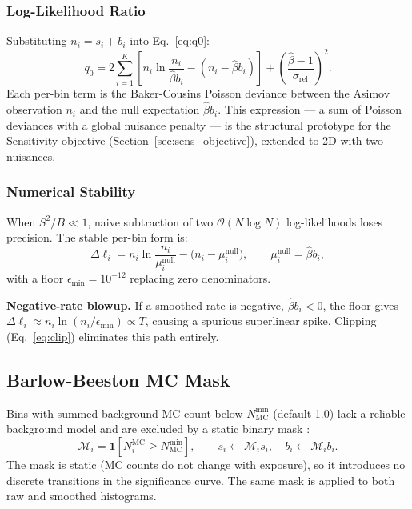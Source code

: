 \documentclass[12pt,a4paper]{article}
\newcommand{\si}{s_{i}}                  %
\newcommand{\bi}{b_{i}}                  %
\newcommand{\nni}{n_{i}}                 %
\newcommand{\bhat}{\hat{\beta}}
\newcommand{\srel}{\sigma_{\mathrm{rel}}}
\newcommand{\minexp}{\epsilon_{\min}}
\begin{document}
\subsubsection{Log-Likelihood Ratio}
\label{sec:llr}

Substituting $\nni = \si+\bi$ into Eq.~\eqref{eq:q0}:
\begin{equation}
  q_0 = 2\sum_{i=1}^{K}
    \left[\nni\ln\!\frac{\nni}{\bhat \bi} - (\nni-\bhat \bi)\right]
    + \left(\frac{\bhat-1}{\srel}\right)^{\!2}.
  \label{eq:q0_expanded}
\end{equation}
Each per-bin term is the Baker-Cousins Poisson deviance \cite{BakerCousins1984}
between the Asimov observation $\nni$ and the null expectation $\bhat\bi$.
This expression — a sum of Poisson deviances with a global nuisance penalty
— is the structural prototype for the Sensitivity objective
(Section~\ref{sec:sens_objective}), extended to 2D with two nuisances.

\subsubsection{Numerical Stability}
\label{sec:pl_numerical}

When $S^2/B \ll 1$, naive subtraction of two $\mathcal{O}(N\log N)$
log-likelihoods loses precision.  The stable per-bin form is:
\begin{equation}
  \Delta\ell_i = \nni\ln\!\frac{\nni}{\mu_i^{\mathrm{null}}}
    - \bigl(\nni - \mu_i^{\mathrm{null}}\bigr),
  \qquad
  \mu_i^{\mathrm{null}} = \bhat \bi,
  \label{eq:stable_llr}
\end{equation}
with a floor $\minexp=10^{-12}$ replacing zero denominators.

\medskip
\noindent\textbf{Negative-rate blowup.}
If a smoothed rate is negative, $\bhat\bi<0$, the floor gives
$\Delta\ell_i \approx \nni\ln(\nni/\minexp) \propto T$,
causing a spurious superlinear spike.
Clipping (Eq.~\eqref{eq:clip}) eliminates this path entirely.

\subsection{Barlow-Beeston MC Mask}
\label{sec:bb_mask}

Bins with summed background MC count below $N_{\mathrm{MC}}^{\min}$
(default 1.0) lack a reliable background model and are excluded by a
static binary mask \cite{BarlowBeeston1993}:
\begin{equation}
  \mathcal{M}_i = \mathbf{1}\!\left[N_i^{\mathrm{MC}} \ge N_{\mathrm{MC}}^{\min}\right],
  \qquad
  \si \leftarrow \mathcal{M}_i \si,\quad \bi \leftarrow \mathcal{M}_i \bi.
  \label{eq:bb_mask_hep}
\end{equation}
The mask is static (MC counts do not change with exposure), so it introduces
no discrete transitions in the significance curve.
The same mask is applied to both raw and smoothed histograms.
\end{document}
